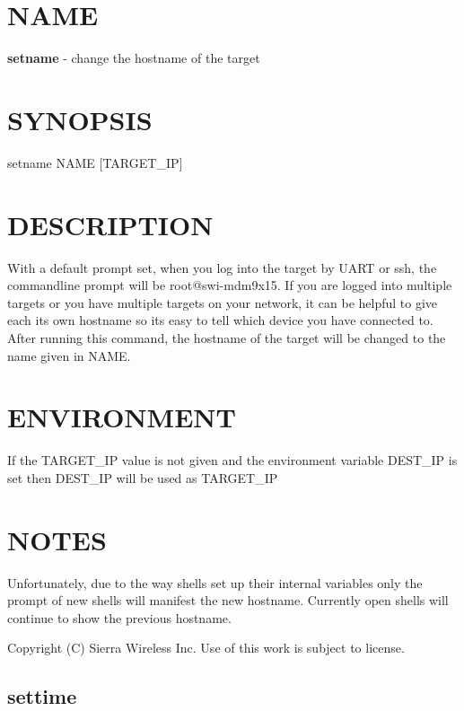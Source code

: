 \section*{N\+A\+M\+E}

{\bfseries setname} -\/ change the hostname of the target

\section*{S\+Y\+N\+O\+P\+S\+I\+S}

{\ttfamily setname N\+A\+M\+E \mbox{[}T\+A\+R\+G\+E\+T\+\_\+\+I\+P\mbox{]}}~\newline


\section*{D\+E\+S\+C\+R\+I\+P\+T\+I\+O\+N}

With a default prompt set, when you log into the target by U\+A\+R\+T or ssh, the commandline prompt will be root@swi-\/mdm9x15. If you are logged into multiple targets or you have multiple targets on your network, it can be helpful to give each its own hostname so its easy to tell which device you have connected to. After running this command, the hostname of the target will be changed to the name given in N\+A\+M\+E.

\section*{E\+N\+V\+I\+R\+O\+N\+M\+E\+N\+T}

\begin{DoxyVerb}If the TARGET_IP value is not given and the environment variable DEST_IP
is set then DEST_IP will be used as TARGET_IP
\end{DoxyVerb}


\section*{N\+O\+T\+E\+S}

Unfortunately, due to the way shells set up their internal variables only the prompt of new shells will manifest the new hostname. Currently open shells will continue to show the previous hostname.



 Copyright (C) Sierra Wireless Inc. Use of this work is subject to license. \hypertarget{toolsHost_settime}{}\subsection{settime}\label{toolsHost_settime}
